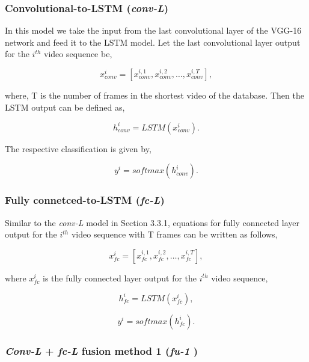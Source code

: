 \documentclass[10pt,twocolumn,letterpaper]{article}
\begin{document}
  
\subsubsection{Convolutional-to-LSTM (\textit{conv-L})}
 
 In this model we take the input from the last convolutional layer of the VGG-16 network and feed it to the LSTM model. Let the last convolutional layer output for the $i^{th}$ video sequence be,
  
\begin{equation}
x^i_{conv}=[x^{i,1}_{conv}, x^{i,2}_{conv}, \ldots,x^{i,T}_{conv}],
\label{eq:1}
\end{equation}

where, T is the number of frames in the shortest video of the database.
Then the LSTM output can be defined as, 

\begin{equation}
h^i_{conv}= LSTM(x^i_{conv}).
\label{eq:2}
\end{equation}

The respective classification is given by, 

\begin{equation}
y^i=softmax(h^i_{conv}).
\label{eq:3}
\end{equation}


\subsubsection{Fully connetced-to-LSTM (\textit{fc-L})}

Similar to the \textit{conv-L} model in Section 3.3.1, equations for fully connected layer output for the $i^{th}$ video sequence with T frames can be written as follows,

\begin{equation}
x^i_{fc}=[x^{i,1}_{fc}, x^{i,2}_{fc}, \ldots,x^{i,T}_{fc}],
\label{eq:4}
\end{equation}

where $x^i_{fc}$ is the fully connected layer output for the $i^{th}$ video sequence, 

\begin{equation}
h^i_{fc}= LSTM(x^i_{fc}),
\label{eq:5}
\end{equation}

\begin{equation}
y^i=softmax(h^i_{fc}).
\label{eq:6}
\end{equation}

\subsubsection{\textit{Conv-L} + \textit{fc-L} fusion method 1 (\textit{fu-1} )}
\end{document}
